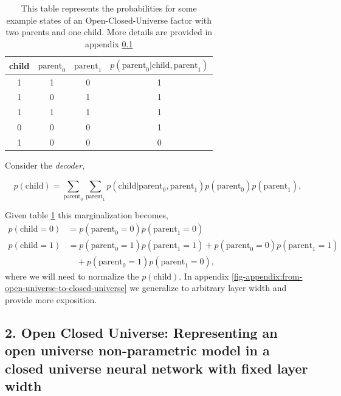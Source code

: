 \documentclass{article}
\begin{document}
\begin{table}[H]
    \setlength{\extrarowheight}{5pt}
    \centering
    \begin{tabular}{c|c|c|c}
        \hline\hline
        child & $\text{parent}_0$ & $\text{parent}_1$ & $p(\text{parent}_0|\text{child}, \text{parent}_1)$ \\[1ex]
        \hline
        1    & 1          & 0          & 1 \\
        1    & 0          & 1          & 1 \\
        1    & 1          & 1          & 1 \\
        0    & 0          & 0          & 1 \\
        1    & 0          & 0          & 0 \\[1ex]
        \hline
    \end{tabular}
    \caption{This table represents the probabilities for some example states of an Open-Closed-Universe factor with two parents and one child.  More details are provided in appendix \ref{appendix:Open-Closed-Universe}}
    \label{tab:open-universe-encoder}
\end{table}

Consider the \emph{decoder},

\begin{equation}
    p(\text{child}) = \sum_{\text{parent}_0} \sum_{\text{parent}_1} 
    p(\text{child}| \text{parent}_0, \text{parent}_1 ) p(\text{parent}_0)p(\text{parent}_1),
\end{equation}

Given table \ref{tab:open-universe-encoder} this marginalization becomes,
\begin{align}
    p(\text{child}=0) &= p(\text{parent}_0=0)p(\text{parent}_1=0) \\
    p(\text{child}=1) &= p(\text{parent}_0=1)p(\text{parent}_1=1) 
    +  p(\text{parent}_0=0)p(\text{parent}_1=1) \nonumber \\
    &\quad+ p(\text{parent}_0=1)p(\text{parent}_1=0),
\end{align}
where we will need to normalize the $p(\text{child})$.  In appendix \ref{fig-appendix:from-open-universe-to-closed-universe} we generalize to arbitrary layer width and provide more exposition.

\subsection{2. Open Closed Universe: Representing an open universe non-parametric model in a closed universe neural network with fixed layer width}\label{appendix:Open-Closed-Universe}
\end{document}
